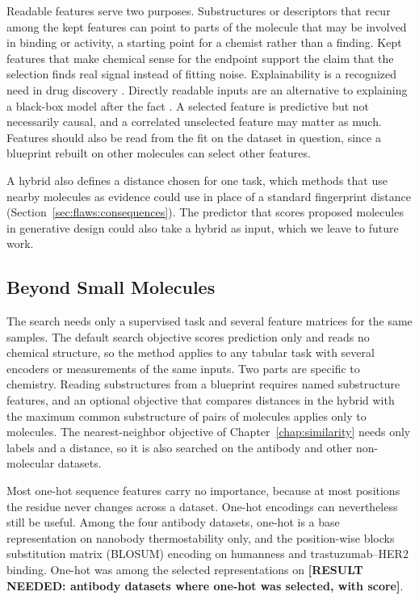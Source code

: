 Readable features serve two purposes. Substructures or descriptors that recur among the kept features can point to parts of the molecule that may be involved in binding or activity, a starting point for a chemist rather than a finding. Kept features that make chemical sense for the endpoint support the claim that the selection finds real signal instead of fitting noise. Explainability is a recognized need in drug discovery \citep{JimenezLuna2020}. Directly readable inputs are an alternative to explaining a black-box model after the fact \citep{Rudin2019}. A selected feature is predictive but not necessarily causal, and a correlated unselected feature may matter as much. Features should also be read from the fit on the dataset in question, since a blueprint rebuilt on other molecules can select other features.

A hybrid also defines a distance chosen for one task, which methods that use nearby molecules as evidence could use in place of a standard fingerprint distance (Section~\ref{sec:flaws:consequences}). The predictor that scores proposed molecules in generative design \citep{Olivecrona2017} could also take a hybrid as input, which we leave to future work.


\subsection{Beyond Small Molecules}

The search needs only a supervised task and several feature matrices for the same samples. The default search objective scores prediction only and reads no chemical structure, so the method applies to any tabular task with several encoders or measurements of the same inputs. Two parts are specific to chemistry. Reading substructures from a blueprint requires named substructure features, and an optional objective that compares distances in the hybrid with the maximum common substructure of pairs of molecules applies only to molecules. The nearest-neighbor objective of Chapter~\ref{chap:similarity} needs only labels and a distance, so it is also searched on the antibody and other non-molecular datasets.

Most one-hot sequence features carry no importance, because at most positions the residue never changes across a dataset. One-hot encodings can nevertheless still be useful. Among the four antibody datasets, one-hot is a base representation on nanobody thermostability only, and the position-wise blocks substitution matrix (BLOSUM) encoding on humanness and trastuzumab--HER2 binding. One-hot was among the selected representations on \textbf{[RESULT NEEDED: antibody datasets where one-hot was selected, with score]}.

